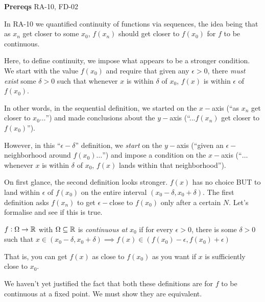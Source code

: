 

\textbf{Prereqs} RA-10, FD-02

In RA-10 we quantified continuity of functions via sequences, the idea being that as $x_n$ get closer to some $x_0$, $f(x_n)$ should get closer to $f(x_0)$ for $f$ to be continuous.

Here, to define continuity, we impose what appears to be a stronger condition. We start with the value $f(x_0)$ and require that given any $\epsilon > 0$, there \emph{must exist} some $\delta > 0$ such that whenever $x$ is within $\delta$ of $x_0$, $f(x)$ is within $\epsilon$ of $f(x_0)$.

In other words, in the sequential definition, we started on the $x-$axis (``as $x_n$ get closer to $x_0\dots$'') and made conclusions about the $y-$axis (``...$f(x_n)$ get closer to $f(x_0)$'').

However, in this ``$\epsilon-\delta$'' definition, we \emph{start} on the $y-$axis (``given an $\epsilon-$neighborhood around $f(x_0)\dots$'') and impose a condition on the $x-$axis (``$\dots$whenever $x$ is within $\delta$ of $x_0$, $f(x)$ lands within that neighborhood'').

On first glance, the second definition looks stronger. $f(x)$ has no choice BUT to land within $\epsilon$ of $f(x_0)$ on the entire interval $(x_0 - \delta, x_0 + \delta)$. The first definition asks $f(x_n)$ to get $\epsilon-$close to $f(x_0)$ only after a certain $N$. Let's formalise and see if this is true.

\begin{SNP}{\dfn}{$f:\Omega \rightarrow \mathbb{R}$ with $\Omega \subseteq \mathbb{R}$ is \emph{continuous at} $x_0$ if for every $\epsilon > 0$, there is some $\delta > 0$ such that $x \in (x_0 - \delta, x_0 + \delta) \implies f(x) \in (f(x_0) - \epsilon, f(x_0) + \epsilon)$}
\end{SNP}

That is, you can get $f(x)$ as close to $f(x_0)$ as you want if $x$ is sufficiently close to $x_0$.

We haven't yet justified the fact that both these definitions are for $f$ to be continuous at a fixed point. We must show they are equivalent.

